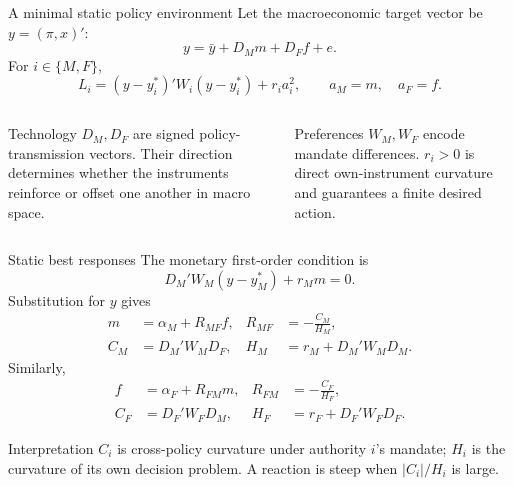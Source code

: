 \documentclass[10pt,aspectratio=169]{beamer}
\begin{document}
\begin{frame}{A minimal static policy environment}
Let the macroeconomic target vector be $y=(\pi,x)'$:
\begin{equation*}
\boxed{y=\bar y+D_Mm+D_Ff+e.}
\end{equation*}
For $i\in\{M,F\}$,
\begin{equation*}
L_i=(y-y_i^*)'W_i(y-y_i^*)+r_i a_i^2,
\qquad a_M=m,\quad a_F=f.
\end{equation*}
\begin{columns}[T,onlytextwidth]
\begin{block}{Technology}
$D_M,D_F$ are signed policy-transmission vectors. Their direction determines
whether the instruments reinforce or offset one another in macro space.
\end{block}
\begin{block}{Preferences}
$W_M,W_F$ encode mandate differences. $r_i>0$ is direct own-instrument
curvature and guarantees a finite desired action.
\end{block}
\end{columns}
\end{frame}

\begin{frame}{Static best responses}
The monetary first-order condition is
\begin{equation*}
D_M'W_M(y-y_M^*)+r_Mm=0.
\end{equation*}
Substitution for $y$ gives
\begin{align*}
m&=\alpha_M+R_{MF}f, &
R_{MF}&=-\frac{C_M}{H_M},\\
C_M&=D_M'W_MD_F, &
H_M&=r_M+D_M'W_MD_M.
\end{align*}
Similarly,
\begin{align*}
f&=\alpha_F+R_{FM}m, &
R_{FM}&=-\frac{C_F}{H_F},\\
C_F&=D_F'W_FD_M, &
H_F&=r_F+D_F'W_FD_F.
\end{align*}
\begin{alertblock}{Interpretation}
$C_i$ is cross-policy curvature under authority $i$'s mandate; $H_i$ is the
curvature of its own decision problem. A reaction is steep when
$|C_i|/H_i$ is large.
\end{alertblock}
\end{frame}
\end{document}
